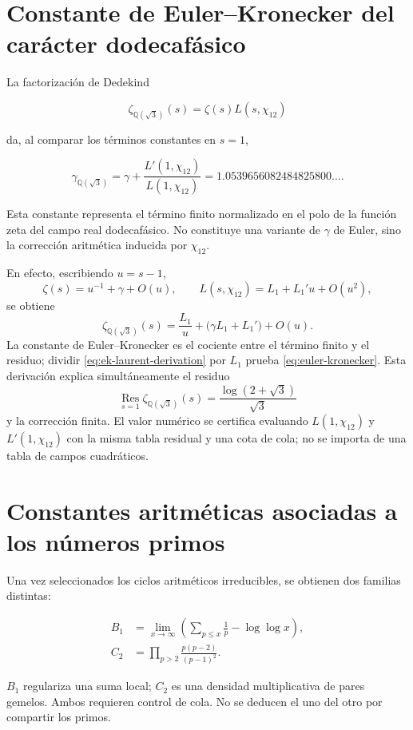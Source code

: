 \section{Constante de Euler--Kronecker del car\'acter dodecaf\'asico}

La factorizaci\'on de Dedekind

\begin{equation}
\zeta_{\mathbb Q(\sqrt3)}(s)=\zeta(s)L(s,\chi_{12})
\label{eq:dedekind-sqrt3}
\end{equation}

da, al comparar los t\'erminos constantes en \(s=1\),

\begin{equation}
\gamma_{\mathbb Q(\sqrt3)}
=\gamma+\frac{L'(1,\chi_{12})}{L(1,\chi_{12})}
=1.0539656082484825800\ldots.
\label{eq:euler-kronecker}
\end{equation}

Esta constante representa el t\'ermino finito normalizado en el polo de la
funci\'on zeta del campo real dodecaf\'asico. No constituye una variante de
\(\gamma\) de Euler, sino la correcci\'on aritm\'etica inducida por
\(\chi_{12}\).

En efecto, escribiendo \(u=s-1\),
\[
\zeta(s)=u^{-1}+\gamma+O(u),
\qquad
L(s,\chi_{12})=L_1+L_1'u+O(u^2),
\]
se obtiene
\begin{equation}
\zeta_{\mathbb Q(\sqrt3)}(s)
=\frac{L_1}{u}+\bigl(\gamma L_1+L_1'\bigr)+O(u).
\label{eq:ek-laurent-derivation}
\end{equation}
La constante de Euler--Kronecker es el cociente entre el t\'ermino finito y
el residuo; dividir \cref{eq:ek-laurent-derivation} por \(L_1\) prueba
\cref{eq:euler-kronecker}. Esta derivaci\'on explica simult\'aneamente el
residuo
\[
\operatorname*{Res}_{s=1}\zeta_{\mathbb Q(\sqrt3)}(s)
=\frac{\log(2+\sqrt3)}{\sqrt3}
\]
y la correcci\'on finita. El valor num\'erico se certifica evaluando
\(L(1,\chi_{12})\) y \(L'(1,\chi_{12})\) con la misma tabla residual y una
cota de cola; no se importa de una tabla de campos cuadr\'aticos.

\section{Constantes aritm\'eticas asociadas a los n\'umeros primos}

Una vez seleccionados los ciclos aritm\'eticos irreducibles, se obtienen dos
familias distintas:

\begin{align}
B_1&=\lim_{x\to\infty}\left(
\sum_{p\le x}\frac1p-\log\log x
\right),
\label{eq:meissel-mertens}\\
C_2&=\prod_{p>2}\frac{p(p-2)}{(p-1)^2}.
\label{eq:twin-prime-constant}
\end{align}

\(B_1\) regulariza una suma local; \(C_2\) es una densidad multiplicativa de pares gemelos. Ambos requieren control de cola. No se deducen el uno del otro por compartir los primos.

